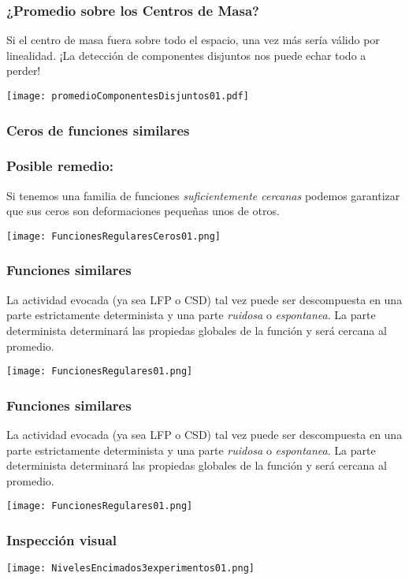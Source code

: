 \documentclass{beamer}
\begin{document}
\begin{frame}
  \frametitle{¿Promedio sobre los Centros de Masa?}
  Si el centro de masa fuera sobre todo el espacio, una
  vez más sería válido por linealidad. ¡La
  detección de componentes disjuntos nos puede echar todo a
  perder!
\begin{center}
 \texttt{[image: promedioComponentesDisjuntos01.pdf]}
\end{center}
\end{frame}


\begin{frame}
\frametitle{Ceros de funciones similares}
  \frametitle{Posible remedio:}
  Si tenemos una familia de funciones \emph{suficientemente cercanas}
  podemos garantizar
  que sus ceros son deformaciones pequeñas unos de otros. 
\begin{center}
 \texttt{[image: FuncionesRegularesCeros01.png]}
\end{center}
\end{frame}


\begin{frame}
  \frametitle{Funciones similares}
  La actividad evocada (ya sea LFP o CSD) tal vez puede ser descompuesta
  en una parte estrictamente determinista y una parte \emph{ruidosa}
  o \emph{espontanea}. La parte determinista determinará las propiedas globales de la
  función y será cercana al promedio.
\begin{center}
 \texttt{[image: FuncionesRegulares01.png]}
\end{center}
\end{frame}


\begin{frame}
  \frametitle{Funciones similares}
  La actividad evocada (ya sea LFP o CSD) tal vez puede ser descompuesta
  en una parte estrictamente determinista y una parte \emph{ruidosa}
  o \emph{espontanea}. La parte determinista determinará las propiedas globales de la
  función y será cercana al promedio.
\begin{center}
 \texttt{[image: FuncionesRegulares01.png]}
\end{center}
\end{frame}


\begin{frame}
  \frametitle{Inspección visual}
\begin{center}
  \texttt{[image: NivelesEncimados3experimentos01.png]} 
\end{center}

\end{frame}
\end{document}
